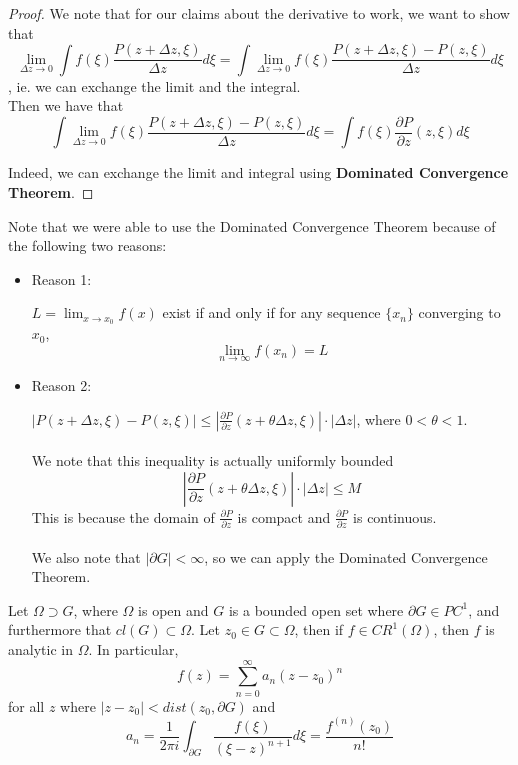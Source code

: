 \begin{proof}
We note that for our claims about the derivative to work, we want to show that
$$\lim_{\Delta z \to 0} \int f(\xi) \frac{P(z + \Delta z, \xi)}{\Delta z} d\xi = \int \lim_{\Delta z \to 0} f(\xi) \frac{P(z + \Delta z, \xi) - P(z, \xi)}{\Delta z} d\xi$$
, ie. we can exchange the limit and the integral.\\

Then we have that
$$\int \lim_{\Delta z \to 0} f(\xi) \frac{P(z + \Delta z, \xi) - P(z, \xi)}{\Delta z} d\xi = \int f(\xi) \frac{\partial P}{\partial z}(z, \xi) d\xi$$

Indeed, we can exchange the limit and integral using \textbf{Dominated Convergence Theorem}.
\end{proof}

\begin{remark}
    Note that we were able to use the Dominated Convergence Theorem because of the following two reasons:
\begin{itemize}
    \item Reason 1:
\begin{lemma}
$L = \lim_{x \to x_0} f(x)$ exist if and only if for any sequence $\{x_n\}$ converging to $x_0$, 
\[\lim_{n \to \infty} f(x_n) = L\]
\end{lemma}
\item Reason 2:
\begin{theorem}
$|P(z + \Delta z, \xi) - P(z, \xi)| \leq |\frac{\partial P}{\partial z}(z + \theta \Delta z, \xi)| \cdot |\Delta z|$, where $0 < \theta < 1$.\\\\
We note that this inequality is actually uniformly bounded
\[|\frac{\partial P}{\partial z}(z + \theta \Delta z, \xi)| \cdot |\Delta z| \leq M\]
This is because the domain of $\frac{\partial P}{\partial z}$ is compact and $\frac{\partial P}{\partial z}$ is continuous.\\\\
We also note that $|\partial G| < \infty$, so we can apply the Dominated Convergence Theorem.
\end{theorem}
\end{itemize}
\end{remark}

\begin{theorem}
Let $\Omega \supset G$, where $\Omega$ is open and $G$ is a bounded open set where $\partial G \in PC^1$, and furthermore that $cl(G) \subset \Omega$. Let $z_0 \in G \subset \Omega$, then if $f \in CR^1(\Omega)$, then $f$ is analytic in $\Omega$. In particular,
$$f(z) = \sum_{n = 0}^\infty a_n (z - z_0)^n$$ for all $z$ where $|z - z_0| < dist(z_0, \partial G)$ and
\[a_n = \frac{1}{2\pi i} \int_{\partial G} \frac{f(\xi)}{(\xi - z)^{n+1}} d\xi = \frac{f^{(n)}(z_0)}{n!}\]
\end{theorem}


